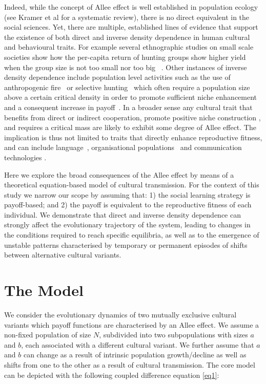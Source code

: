 \documentclass[review,authoryear]{elsarticle}
\begin{document}
Indeed, while the concept of Allee effect is well established in population ecology (see Kramer et al \citeyear{kramer_etal_2009} for a systematic review), there is no direct equivalent in the social sciences. Yet, there are multiple, established lines of evidence that support  the existence of both direct and inverse density dependence in human cultural and behavioural traits. For example several ethnographic studies on small scale societies show how the per-capita return of hunting groups show higher yield when the group size is not too small nor too big~ \citep{hill_and_hawkes_1983,janssen_and_hill_2014}. Other instances of inverse density dependence include population level activities such as the use of anthropogenic fire~\citep{bird2013} or selective hunting~\citep{dods_2002} which often require a population size above a certain critical density in order to promote sufficient niche enhancement and a consequent increase in payoff~\citep{rowley-conwy_and_layton_2011}. In a broader sense any cultural trait that benefits from direct or indirect cooperation, 
promote positive niche construction \citep{vandermeer_2008}, and requires a critical mass \citep{rogers_2003} are likely to exhibit some degree of Allee effect. The implication is thus not limited to traits that directly enhance reproductive fitness, and can include language~\citep{kandler2009}, organisational populations~\citep{caroll_and_hannan_1989} and communication technologies \citep{van_slyke_perceived_2007}.

Here we explore the broad consequences of the Allee effect by means of a theoretical equation-based model of cultural transmission. For the context of this study we narrow our scope by assuming that: 1) the social learning strategy is payoff-based; and 2)  the payoff is equivalent to the reproductive fitness of each individual. We demonstrate that direct and inverse density dependence can strongly affect the evolutionary trajectory of the system, leading to changes in the conditions required to reach specific equilibria, as well as to the emergence of unstable patterns characterised by temporary or permanent episodes of shifts between alternative cultural variants.

\section{The Model}
We consider the evolutionary dynamics of two mutually exclusive cultural variants which payoff functions are characterised by an Allee effect. We assume a non-fixed population of size $N$, subdivided into two subpopulations with sizes $a$ and $b$, each associated with a different cultural variant. We further assume that $a$ and $b$ can change as a result of intrinsic population growth/decline as well as shifts from one to the other as a result of cultural transmission. The core model can be depicted with the following coupled difference equation \eqref{eq1}:
\end{document}
